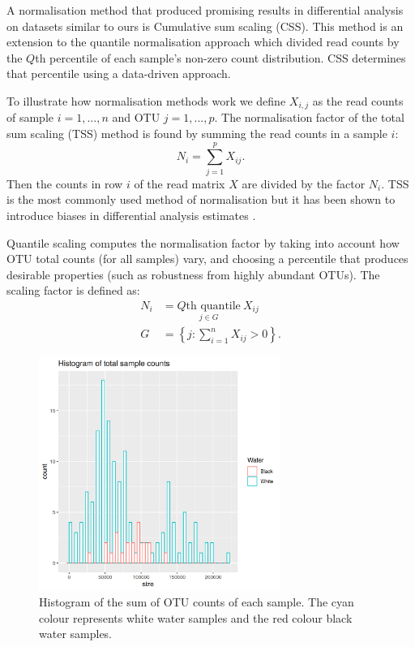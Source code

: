  A normalisation method that produced promising results in differential analysis on datasets similar to ours is Cumulative sum scaling (CSS). This method is an extension to the quantile normalisation approach which divided read counts by the $Q$th percentile of each sample’s non-zero count distribution. CSS determines that percentile using a data-driven approach\cite{css_diff_abund}.
 
 To illustrate how normalisation methods work we define $X_{i,j}$ as the read counts of sample  $i =1,...,n$ and OTU $j=1,...,p$. The normalisation factor of the total sum scaling (TSS) method is found by summing the read counts in a sample $i$:
 \begin{equation}
 	N_i = \sum_{j=1}^{p} X_{ij}.
 \end{equation}
Then the counts in row $i$ of the read matrix $X$ are divided by the factor $N_i$. TSS is the most commonly used method of normalisation but it has been shown to introduce biases in differential analysis estimates \cite{bullard_evaluation_2010}.

Quantile scaling computes the normalisation factor by taking into account how OTU total counts (for all samples) vary, and choosing a percentile that produces desirable properties (such as robustness from highly abundant OTUs).
The scaling factor is defined as:
\begin{align}
	N_i &= \underset{ j \in G}{ Q\text{th quantile}} \  X_{ij}\\
	G  &= \left\{ j : \sum_{i = 1}^{n} X_{ij} > 0\right\}.
\end{align}

 
\begin{figure}[htb]
\centering
\includegraphics[width = 0.7\textwidth]{histogramofcountdata}
\caption{Histogram of the sum of OTU counts of each sample. The cyan colour represents white water samples and the red colour black water samples.}
\label{fig:counthistogram}
\end{figure}

